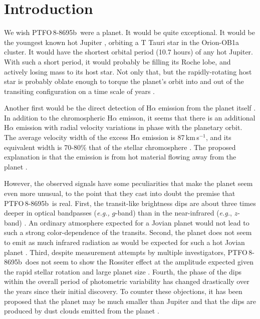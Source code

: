 \documentclass[12pt,twocolumn,tighten]{aastex62}
\newcommand{\ptfob}{PTFO$\,$8-8695b}
\begin{document}



\section{Introduction}

We wish \ptfob\ were a planet. It would be quite exceptional. It would
be the youngest known hot Jupiter \citep{van_eyken_ptf_2012}, orbiting
a T Tauri star in the Orion-OB1a cluster.  It would have the shortest
orbital period (10.7 hours) of any hot Jupiter.  With such a short
period, it would probably be filling its Roche lobe, and actively
losing mass to its host star.  Not only that, but the rapidly-rotating
host star is probably oblate enough to torque the planet's orbit into
and out of the transiting configuration on a time scale of years
\citep{barnes_measurement_2013,ciardi_followup_2015,kamiaka_revisiting_2015}. 

Another first would be the direct detection of H$\alpha$ emission from
the planet itself \citep{johnskrull_h_2016}.  In addition to the
chromospheric H$\alpha$ emisson, it seems that there is an additional
H$\alpha$ emission with radial velocity variations in phase with the
planetary orbit.  The average velocity width of the excess H$\alpha$
emission is 87$\,$km$\,$s$^{-1}$, and its equivalent width is 70-80\%
that of the stellar chromosphere \citep{johnskrull_h_2016}.  The
proposed explanation is that the emission is from hot material flowing
away from the planet \citep{johnskrull_h_2016}.

However, the observed signals have some peculiarities that make the
planet seem even more unusual, to the point that they cast into doubt
the premise that \ptfob\ is real.  First, the transit-like brightness
dips are about three times deeper in optical bandpasses ({\it e.g.,}
$g$-band) than in the near-infrared ({\it e.g.}, $z$-band)
\citep{onitsuka_multicolor_2017,tanimoto_evidence_2020}.  An ordinary
atmosphere expected for a Jovian planet would not lead to such a
strong color-dependence of the transits.  Second, the planet does not
seem to emit as much infrared radiation as would be expected for such
a hot Jovian planet \citep{yu_tests_2015}.  Third, despite measurement
attempts by multiple investigators, \ptfob\ does not seem to show the
Rossiter effect at the amplitude expected given the rapid stellar
rotation and large planet size
\citep{yu_tests_2015,ciardi_followup_2015}.  Fourth, the phase of the
dips within the overall period of photometric variability has changed
drastically over the years since their initial discovery.  To counter
these objections, it has been proposed that the planet may be much
smaller than Jupiter and that the dips are produced by dust clouds
emitted from the planet \citep{tanimoto_evidence_2020}. 
\end{document}
